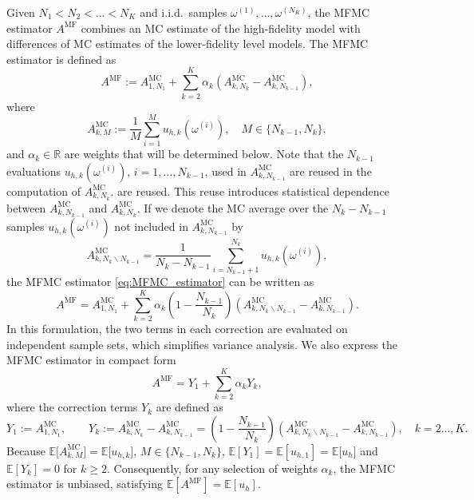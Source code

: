 Given $N_1 < N_2 < \ldots < N_K$ and i.i.d.\ samples $\omega^{(1)}, \ldots, \omega^{(N_K)}$,
the MFMC estimator $A^{\text{MF}}$ combines an MC estimate of the high-fidelity model with differences 
of MC estimates of the lower-fidelity level models.
The MFMC estimator is defined as
\begin{equation}\label{eq:MFMC_estimator}
    A^{\text{MF}}
     := A^{\text{MC}}_{1,N_1} + \sum_{k=2}^K \alpha_k\left(A^{\text{MC}}_{k,N_k} - A^{\text{MC}}_{k,N_{k-1}} \right),
\end{equation}
where
\begin{equation}\label{eq:MFMC_estimator_MCk}
     A^{\text{MC}}_{k,M} :=  \frac{1}{M} \sum_{i=1}^{M}   u_{h,k}(\omega^{(i)}), \quad M \in \{ N_{k-1}, N_k \},
\end{equation}
and $\alpha_k\in \mathbb{R}$ are weights that will be determined below.
Note that the $N_{k-1}$ evaluations $u_{h,k}(\omega^{(i)})$, $i = 1, \ldots,  N_{k-1}$,
used in  $A^{\text{MC}}_{k,N_{k-1}}$ are reused in  the computation of $A^{\text{MC}}_{k,N_k}$.
are reused. This reuse introduces statistical dependence between 
$A^{\text{MC}}_{k,N_{k-1}}$ and $A^{\text{MC}}_{k,N_k}$. 
If we denote the MC average over the $N_k - N_{k-1}$ samples $u_{h,k}(\omega^{(i)})$ 
not included in $A^{\text{MC}}_{k,N_{k-1}}$ by
\[
     A^{\text{MC}}_{k,N_k \backslash N_{k-1}}
      =  \frac{1}{N_k-N_{k-1}}  \sum_{i=N_{k-1}+1}^{N_k}   u_{h,k}(\omega^{(i)}), 
\]
the MFMC estimator \eqref{eq:MFMC_estimator} can be written as
\begin{equation}\label{eq:MFMC_estimator_independent}
    A^{\text{MF}} 
    = A^{\text{MC}}_{1,N_1} 
      +  \sum_{k=2}^K \alpha_k\left(1-\frac{N_{k-1}}{N_k}\right)
                               \left(A_{k,N_k\backslash N_{k-1}}^{\text{MC}}-A_{k,N_{k-1}}^{\text{MC}}\right).
\end{equation}
In this formulation, the two terms in each correction are evaluated on independent sample sets, 
which simplifies variance analysis. 
We also express the MFMC estimator in compact form
\begin{equation*}\label{eq:MFMC_estimator_Correction}
          A^{\text{MF}} = Y_1 + \sum_{k=2}^K \alpha_k Y_k,
\end{equation*}
where the correction terms $Y_k$ are defined as
\begin{equation} \label{eq:MFMC_Yk}
       Y_1 := A^{\text{MC}}_{1,N_1},\qquad 
       Y_k := A^{\text{MC}}_{k,N_k} - A^{\text{MC}}_{k,N_{k-1}}
               =\left(1-\frac{N_{k-1}}{N_k}\right)
                 \left(A_{k,N_k\backslash N_{k-1}}^{\text{MC}}-A_{k,N_{k-1}}^{\text{MC}}\right), \quad k=2\ldots, K.
\end{equation}
%
Because $\mathbb{E}\big[ A^{\text{MC}}_{k,M} \big] = \mathbb{E}\big[ u_{h,k} \big]$, $M \in \{ N_{k-1}, N_k \}$,
$\mathbb{E}[Y_1] =  \mathbb{E}[u_{h,1}]  = \mathbb{E}\big[ u_h \big]$ and  $\mathbb{E}[Y_k] = 0$ for $k\ge 2$.
Consequently, for any selection of weights $\alpha_k$, 
the MFMC estimator is  unbiased, satisfying $\mathbb{E}[A^{\text{MF}}] =  \mathbb{E}[u_h]$. 


